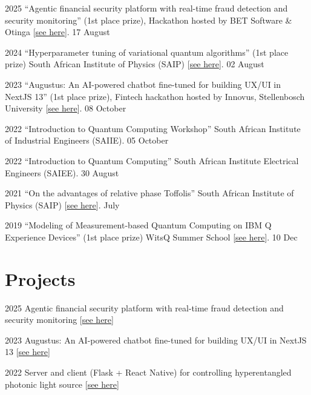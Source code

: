 \documentclass[10pt]{extreport}
\begin{document}
\begin{tablist}
	\item[2025] \tab{}\enquote{Agentic financial security platform with real-time fraud detection and security monitoring} (1st place prize), Hackathon hosted by BET Software \& Otinga [\href{https://github.com/ThamuMnyulwa/bet-hackathon-2025}{see here}]. 17 August
	\item[2024] \tab{}\enquote{Hyperparameter tuning of variational quantum algorithms}  (1st place prize) South
		African Institute of Physics (SAIP) [\href{https://github.com/Unathi-Skosana/posters-n-presentations/blob/main/presentations/saip2024/saip2024_final.pdf}{see here}]. 02 August
	\item[2023]  \tab{} \enquote{Augustus: An AI-powered chatbot fine-tuned for building UX/UI in NextJS 13} (1st place prize), Fintech hackathon hosted by Innovus, Stellenbosch University [\href{https://github.com/Unathi-Skosana/posters-n-presentations/blob/main/presentations/su-innovus-hackathon-2023/export/Augustus-SU-hackathon-presentation.pdf}{see here}]. 08 October
	\item[2022] \tab{}\enquote{Introduction to Quantum Computing Workshop} South African Institute of Industrial Engineers (SAIIE). 05 October
	\item[2022] \tab{}\enquote{Introduction to Quantum Computing} South African Institute Electrical Engineers (SAIEE). 30 August
	\item[2021] \tab{}\enquote{On the advantages of relative phase Toffolis} South
	African Institute of Physics (SAIP) [\href{https://github.com/Unathi-Skosana/posters-n-presentations/blob/main/posters/saip-2021/release/poster.pdf}{see here}].  July
	\item[2019] \tab{}\enquote{Modeling of Measurement-based Quantum Computing on
		IBM Q Experience Devices}  (1st place prize) WitsQ Summer School
		[\href{https://github.com/Unathi-Skosana/posters-n-presentations/blob/main/posters/witsq-summer-school-2019/release/poster.pdf}{see here}]. 10 Dec
\end{tablist}

\section*{Projects}

\begin{tablist}
	\item[2025]\tab{}Agentic financial security platform with real-time fraud detection and security monitoring [\href{https://github.com/ThamuMnyulwa/bet-hackathon-2025}{see here}]
	\item[2023]\tab{}Augustus: An AI-powered chatbot fine-tuned for building UX/UI in NextJS 13 [\href{https://github.com/Unathi-Skosana/augustus}{see here}]
	\item[2022]\tab{}Server and client (Flask + React Native) for controlling hyperentangled photonic light source [\href{https://github.com/Unathi-Skosana/hyperentangled-photons-masters-experiment}{see here}]
\end{tablist}
\end{document}
